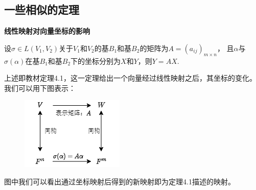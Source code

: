 \subsection{一些相似的定理}
\begin{theorem}
	\textbf{线性映射对向量坐标的影响}
	
	设$\sigma \in L(V_1,V_2)$关于$V_1$和$V_2$的基$B_1$和基$B_2$的矩阵为$A=(a_{ij})_{m \times n}$，
	且$\alpha$与$\sigma(\alpha)$在基$B_1$和基$B_2$下的坐标分别为$X$和$Y$，则$Y=AX$.
\end{theorem}
上述即教材定理4.1，这一定理给出一个向量经过线性映射之后，其坐标的变化。我们可以用下图表示：
\begin{figure}[h]
	\centering
	\includegraphics[scale=0.75]{3.png}
\end{figure}

图中我们可以看出通过坐标映射后得到的新映射即为定理4.1描述的映射。

